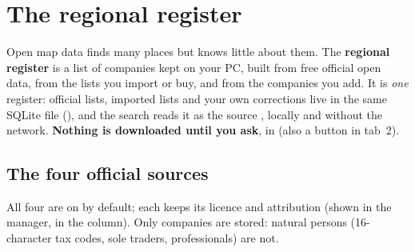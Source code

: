 \chapter{The regional register}\label{ch:register}

Open map data finds many places but knows little about them. The \textbf{regional
register} is a list of companies kept on your PC, built from free official open data,
from the lists you import or buy, and from the companies you add. It is
\emph{one} register: official lists, imported lists and your own corrections live in the same
SQLite file (), and the search reads it as the source
, locally and without the network. \textbf{Nothing is downloaded until
you ask}, in  (also a button in tab~2).

\section{The four official sources}\label{sec:regsources}
All four are on by default; each keeps its licence and attribution (shown in the manager, in the
 column). Only companies are stored: natural persons (16-character tax
codes, sole traders, professionals) are not.

